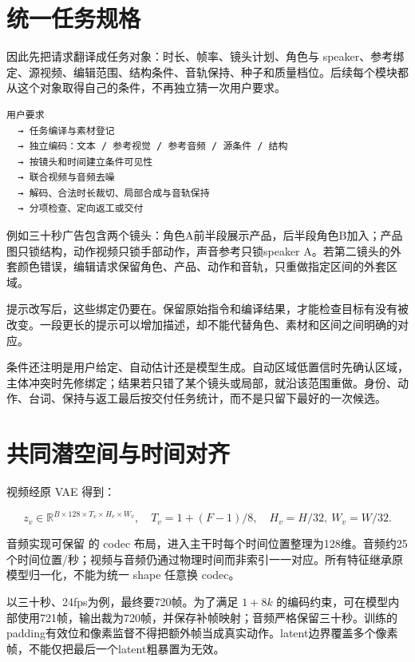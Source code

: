 \section{统一任务规格}\label{seedance-m19-ux7edfux4e00ux4efbux52a1ux89c4ux683c}

因此先把请求翻译成任务对象：时长、帧率、镜头计划、角色与 speaker、参考绑定、源视频、编辑范围、结构条件、音轨保持、种子和质量档位。后续每个模块都从这个对象取得自己的条件，不再独立猜一次用户要求。

\begin{verbatim}
用户要求
  → 任务编译与素材登记
  → 独立编码：文本 / 参考视觉 / 参考音频 / 源条件 / 结构
  → 按镜头和时间建立条件可见性
  → 联合视频与音频去噪
  → 解码、合法时长裁切、局部合成与音轨保持
  → 分项检查、定向返工或交付
\end{verbatim}

例如三十秒广告包含两个镜头：角色A前半段展示产品，后半段角色B加入；产品图只锁结构，动作视频只锁手部动作，声音参考只锁speaker A。若第二镜头的外套颜色错误，编辑请求保留角色、产品、动作和音轨，只重做指定区间的外套区域。

提示改写后，这些绑定仍要在。保留原始指令和编译结果，才能检查目标有没有被改变。一段更长的提示可以增加描述，却不能代替角色、素材和区间之间明确的对应。

条件还注明是用户给定、自动估计还是模型生成。自动区域低置信时先确认区域，主体冲突时先修绑定；结果若只错了某个镜头或局部，就沿该范围重做。身份、动作、台词、保持与返工最后按交付任务统计，而不是只留下最好的一次候选。

\section{共同潜空间与时间对齐}\label{seedance-m19-ux5171ux540cux6f5cux7a7aux95f4ux4e0eux65f6ux95f4ux5bf9ux9f50}

视频经原 VAE 得到：

\[
z_v\in\mathbb{R}^{B\times128\times T_v\times H_v\times W_v},
\quad T_v=1+(F-1)/8,\quad H_v=H/32,\ W_v=W/32.
\]

音频实现可保留  的 codec 布局，进入主干时每个时间位置整理为128维。音频约25个时间位置/秒；视频与音频仍通过物理时间而非索引一一对应。所有特征继承原模型归一化，不能为统一 shape 任意换 codec。

以三十秒、24fps为例，最终要720帧。为了满足 \(1+8k\) 的编码约束，可在模型内部使用721帧，输出裁为720帧，并保存补帧映射；音频严格保留三十秒。训练的padding有效位和像素监督不得把额外帧当成真实动作。latent边界覆盖多个像素帧，不能仅把最后一个latent粗暴置为无效。

